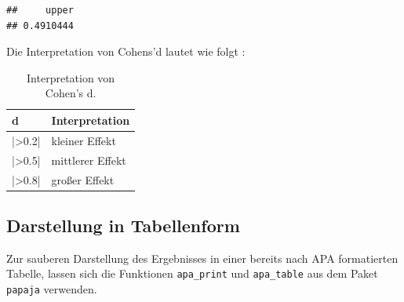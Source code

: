 \documentclass[
]{book}
\newenvironment{Shaded}{\begin{snugshade}}{\end{snugshade}}
\newcommand{\AttributeTok}[1]{\textcolor[rgb]{0.77,0.63,0.00}{#1}}
\newcommand{\FunctionTok}[1]{\textcolor[rgb]{0.00,0.00,0.00}{#1}}
\newcommand{\NormalTok}[1]{#1}
\newcommand{\OtherTok}[1]{\textcolor[rgb]{0.56,0.35,0.01}{#1}}
\newcommand{\SpecialCharTok}[1]{\textcolor[rgb]{0.00,0.00,0.00}{#1}}
\newcommand{\StringTok}[1]{\textcolor[rgb]{0.31,0.60,0.02}{#1}}
\begin{document}
\begin{verbatim}
##     upper 
## 0.4910444
\end{verbatim}

Die Interpretation von Cohens'd lautet wie folgt \citet{cohen1992quantitative}:

\begin{table}[tbp]

\begin{center}
\begin{threeparttable}

\caption{\label{tab:unnamed-chunk-261}Interpretation von Cohen's d.}

\begin{tabular}{ll}
\toprule
d & \multicolumn{1}{c}{Interpretation}\\
\midrule
|>0.2| & kleiner Effekt\\
|>0.5| & mittlerer Effekt\\
|>0.8| & großer Effekt\\
\bottomrule
\end{tabular}

\end{threeparttable}
\end{center}

\end{table}

\hypertarget{darstellung-in-tabellenform-2}{%
\subsection{Darstellung in Tabellenform}\label{darstellung-in-tabellenform-2}}

Zur sauberen Darstellung des Ergebnisses in einer bereits nach APA formatierten Tabelle, lassen sich die Funktionen \texttt{apa\_print} und \texttt{apa\_table} aus dem Paket \texttt{papaja} verwenden.

\begin{Shaded}
\end{Shaded}
\end{document}
